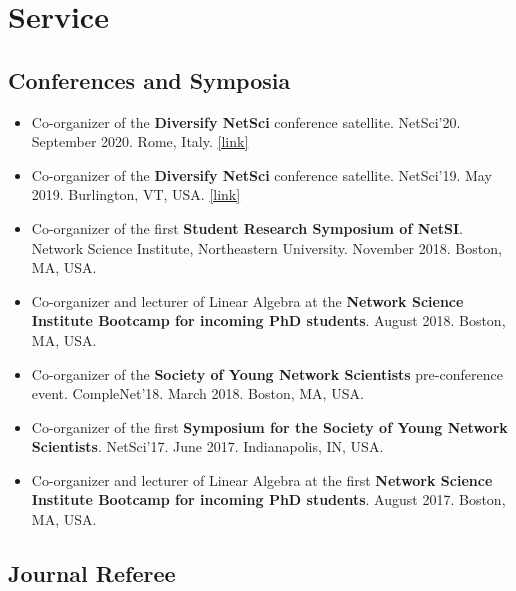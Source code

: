 \documentclass[12pt,]{scrartcl}
\newenvironment{myitemize}
{ \begin{itemize}
    \setlength{\itemsep}{5pt}
    \setlength{\parskip}{0pt}
    \setlength{\parsep}{0pt}     }
{ \end{itemize}                  }
\begin{document}
\section{Service}\label{academic-activities}

\subsection{Conferences and Symposia}\label{conferences}

\begin{myitemize}
\leftskip-0.25in

\item Co-organizer of the \textbf{Diversify NetSci} conference satellite. NetSci'20. September 2020. Rome, Italy. \href{https://www.networkscienceinstitute.org/diversifynetsci2020}{[link]}

\item Co-organizer of the \textbf{Diversify NetSci} conference satellite. NetSci'19. May 2019. Burlington, VT, USA. \href{https://www.networkscienceinstitute.org/diversifynetsci2019}{[link]}

\item Co-organizer of the first \textbf{Student Research Symposium of NetSI}. Network Science Institute, Northeastern University. November 2018. Boston, MA, USA. 

\item Co-organizer and lecturer of Linear Algebra at the \textbf{Network Science Institute Bootcamp for incoming PhD students}. August 2018. Boston, MA, USA.

\item Co-organizer of the \textbf{Society of Young Network Scientists} pre-conference event. CompleNet'18. March 2018. Boston, MA, USA.

\item Co-organizer of the first \textbf{Symposium for the Society of Young Network Scientists}. NetSci'17. June 2017. Indianapolis, IN, USA.

\item Co-organizer and lecturer of Linear Algebra at the first \textbf{Network Science Institute Bootcamp for incoming PhD students}. August 2017. Boston, MA, USA.

\end{myitemize}


\subsection{Journal Referee}\label{journal-referee}
\end{document}
